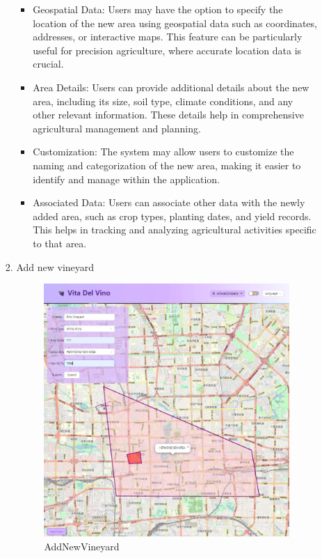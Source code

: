 \begin{enumerate}
\begin{itemize}
\begin{enumerate}
\begin{itemize}
                                  \item Geospatial Data: Users may have the option to specify the location of the new area using geospatial data such as coordinates, addresses, or interactive maps. This feature can be particularly useful for precision agriculture, where accurate location data is crucial.

                                  \item Area Details: Users can provide additional details about the new area, including its size, soil type, climate conditions, and any other relevant information. These details help in comprehensive agricultural management and planning.

                                  \item Customization: The system may allow users to customize the naming and categorization of the new area, making it easier to identify and manage within the application.

                                  \item Associated Data: Users can associate other data with the newly added area, such as crop types, planting dates, and yield records. This helps in tracking and analyzing agricultural activities specific to that area.
                              \end{itemize}
                        \item Add new vineyard
                              \begin{figure}[htbp]
                                  \centering
                                  \includegraphics[width=\textwidth]{images/AddNewVineyard.jpg}
                                  \caption{AddNewVineyard}
                                  \label{fig:AddNewVineyard}
                              \end{figure}


\end{enumerate}
\end{itemize}
\end{enumerate}
